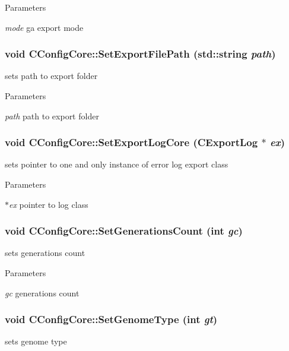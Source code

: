 \begin{DoxyParams}{Parameters}
\item[{\em mode}]ga export mode \end{DoxyParams}
\hypertarget{classCConfigCore_a22b33872f031fcd3e84c4b085dc5a70c}{
\subsubsection[{SetExportFilePath}]{\setlength{\rightskip}{0pt plus 5cm}void CConfigCore::SetExportFilePath (std::string {\em path})}}
\label{classCConfigCore_a22b33872f031fcd3e84c4b085dc5a70c}
sets path to export folder


\begin{DoxyParams}{Parameters}
\item[{\em path}]path to export folder \end{DoxyParams}
\hypertarget{classCConfigCore_ae001e63023359519bff27ff78ce4b5b1}{
\subsubsection[{SetExportLogCore}]{\setlength{\rightskip}{0pt plus 5cm}void CConfigCore::SetExportLogCore ({\bf CExportLog} $\ast$ {\em ex})}}
\label{classCConfigCore_ae001e63023359519bff27ff78ce4b5b1}
sets pointer to one and only instance of error log export class


\begin{DoxyParams}{Parameters}
\item[{\em $\ast$ex}]pointer to log class \end{DoxyParams}
\hypertarget{classCConfigCore_a80569c4ff831e863896ba20e8847d931}{
\subsubsection[{SetGenerationsCount}]{\setlength{\rightskip}{0pt plus 5cm}void CConfigCore::SetGenerationsCount (int {\em gc})}}
\label{classCConfigCore_a80569c4ff831e863896ba20e8847d931}
sets generations count


\begin{DoxyParams}{Parameters}
\item[{\em gc}]generations count \end{DoxyParams}
\hypertarget{classCConfigCore_abcf39df8c0577d64cd2c447584e26734}{
\subsubsection[{SetGenomeType}]{\setlength{\rightskip}{0pt plus 5cm}void CConfigCore::SetGenomeType (int {\em gt})}}
\label{classCConfigCore_abcf39df8c0577d64cd2c447584e26734}
sets genome type


